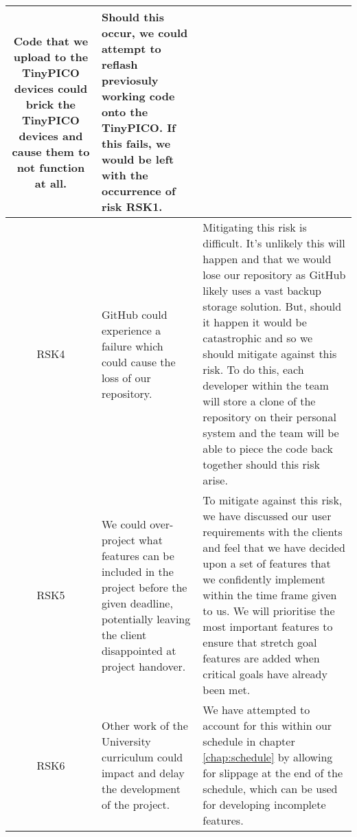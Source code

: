 \begin{xltabular}[H]{\textwidth}{c | X | X}
    Code that we upload to the TinyPICO devices could brick the TinyPICO devices and cause them to not function at all.

    &

    Should this occur, we could attempt to reflash previosuly working code onto the TinyPICO. If this fails, we would be left with the occurrence of risk RSK1.\\

    \midrule

    RSK4

    &

    GitHub could experience a failure which could cause the loss of our repository.

    &

    Mitigating this risk is difficult. It's unlikely this will happen and that we would lose our repository as GitHub likely uses a vast backup storage solution. But, should it happen it would be catastrophic and so we should mitigate against this risk. To do this, each developer within the team will store a clone of the repository on their personal system and the team will be able to piece the code back together should this risk arise.\\

    \midrule

    RSK5

    &

    We could over-project what features can be included in the project before the given deadline, potentially leaving the client disappointed at project handover.

    &

    To mitigate against this risk, we have discussed our user requirements with the clients and feel that we have decided upon a set of features that we confidently implement within the time frame given to us. We will prioritise the most important features to ensure that stretch goal features are added when critical goals have already been met.\\

    \midrule

    RSK6

    &

    Other work of the University curriculum could impact and delay the development of the project.

    &

    We have attempted to account for this within our schedule in chapter \ref{chap:schedule} by allowing for slippage at the end of the schedule, which can be used for developing incomplete features.\\


\end{xltabular}

